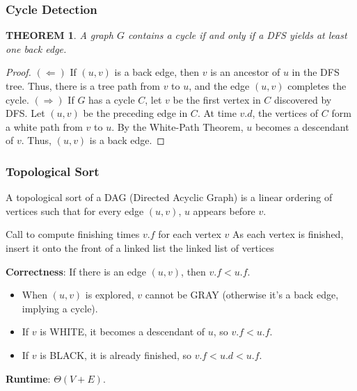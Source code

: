 \documentclass[12pt]{article}
\theoremstyle{blueplain}
\newtheorem{theorem}{THEOREM}[section]
\theoremstyle{bluedef}
\theoremstyle{blueremark}
\begin{document}
\subsubsection{Cycle Detection}
\begin{theorem}
    A graph $G$ contains a cycle if and only if a DFS yields at least one back edge.
\end{theorem}
\begin{proof}
    $(\Leftarrow)$ If $(u,v)$ is a back edge, then $v$ is an ancestor of $u$ in the DFS tree. Thus, there is a tree path from $v$ to $u$, and the edge $(u,v)$ completes the cycle.
    $(\Rightarrow)$ If $G$ has a cycle $C$, let $v$ be the first vertex in $C$ discovered by DFS. Let $(u,v)$ be the preceding edge in $C$. At time $v.d$, the vertices of $C$ form a white path from $v$ to $u$. By the White-Path Theorem, $u$ becomes a descendant of $v$. Thus, $(u,v)$ is a back edge.
\end{proof}

\subsubsection{Topological Sort}
A topological sort of a DAG (Directed Acyclic Graph) is a linear ordering of vertices such that for every edge $(u, v)$, $u$ appears before $v$.

\begin{algorithm}
    \caption{Topological Sort}\label{alg:topologicalSort}
    \begin{algorithmic}[1]
        \State Call  to compute finishing times $v.f$ for each vertex $v$
        \State As each vertex is finished, insert it onto the front of a linked list
        \State \Return the linked list of vertices
        \EndProcedure
    \end{algorithmic}
\end{algorithm}

\textbf{Correctness}: If there is an edge $(u,v)$, then $v.f < u.f$.
\begin{itemize}
    \item When $(u,v)$ is explored, $v$ cannot be GRAY (otherwise it's a back edge, implying a cycle).
    \item If $v$ is WHITE, it becomes a descendant of $u$, so $v.f < u.f$.
    \item If $v$ is BLACK, it is already finished, so $v.f < u.d < u.f$.
\end{itemize}
\textbf{Runtime}: $\Theta(V + E)$.
\end{document}

